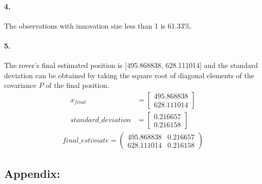 \documentclass[a4paper]{article}
\begin{document}
\paragraph{4. } The observations with innovation size less than 1 is 61.33\%.

\paragraph{5. } The rover's final estimated position is [495.868838, 628.111014] and the standard deviation can be obtained by taking the square root of diagonal elements of the covariance $P$ of the final position.\\
\begin{align*}
	x_{final} &=
	\begin{bmatrix}
		495.868838 \\
    	628.111014
	\end{bmatrix} \\
	standard\_deviation &=
	\begin{bmatrix}
		0.216657 \\
    	0.216158
	\end{bmatrix}
\end{align*}
\begin{align*}
	final\_estimate =
	\begin{pmatrix}
		495.868838 & 0.216657 \\
    	628.111014 & 0.216158
	\end{pmatrix}
\end{align*}

\newpage
\subsection*{Appendix:}




\end{document}
